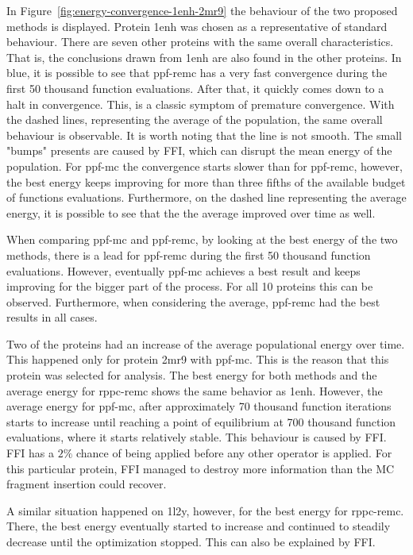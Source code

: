 In Figure~\ref{fig:energy-convergence-1enh-2mr9} the behaviour of the two
proposed methods is displayed. Protein 1enh was chosen as a representative
of standard behaviour.
There are seven other proteins with the same overall characteristics. That is,
the conclusions drawn from 1enh are also found in the other proteins.
In blue, it is possible to see that ppf-remc has a very fast
convergence during the first 50 thousand function evaluations. After that, it
quickly comes down to a halt in convergence. This, is a classic symptom of
premature convergence. With the dashed lines, representing the average of the
population, the same overall behaviour is observable. It is worth noting that
the line is not smooth. The small "bumps" presents are caused by FFI, which
can disrupt the mean energy of the population. For ppf-mc the convergence
starts slower than for ppf-remc, however, the best energy keeps improving
for more than three fifths of the available budget of functions evaluations.
Furthermore, on the dashed line representing the average energy, it is possible
to see that the the average improved over time as well.

When comparing ppf-mc and ppf-remc, by looking at the best energy of the two
methods, there is a lead for ppf-remc during the first 50 thousand function
evaluations. However, eventually ppf-mc achieves a best result and keeps
improving for the bigger part of the process. For all 10 proteins this can be
observed. Furthermore, when considering the average, ppf-remc had the best
results in all cases.

Two of the proteins had an increase of the average populational energy over time.
This happened only for protein 2mr9 with ppf-mc. This is the reason that this
protein was selected for analysis. The best energy for both methods and the
average energy for rppc-remc shows the same behavior as 1enh. However, the
average energy for ppf-mc, after approximately 70 thousand function iterations
starts to increase until reaching a point of equilibrium at 700 thousand
function evaluations, where it starts relatively stable. This behaviour is
caused by FFI. FFI has a $2\%$ chance of being applied before any other operator
is applied. For this particular protein, FFI managed to destroy more information
than the MC fragment insertion could recover.

A similar situation happened on 1l2y, however, for the best energy for
rppc-remc. There, the best energy eventually started to increase and continued
to steadily decrease until the optimization stopped. This can also be explained
by FFI.

